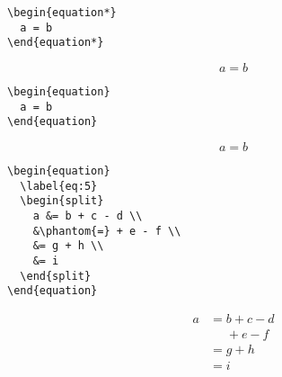\begin{table}[p]
  \caption[Comparaison des environnements pour les équations hors
  paragraphe de ]{%
    Comparaison des environnements pour les équations hors
    paragraphe de  (les lignes verticales indiquent les
    marges logiques).}
  \label{tab:math:displays}
  \renewcommand{\theequation}{\arabic{equation}}
  \begin{eqxample}
\begin{lstlisting}
\begin{equation*}
  a = b
\end{equation*}
\end{lstlisting}
    \producing
    \begin{equation*}
      a = b
    \end{equation*}
  \end{eqxample}

  \begin{eqxample}
\begin{lstlisting}
\begin{equation}
  a = b
\end{equation}
\end{lstlisting}
    \producing
    \begin{equation}
      a = b
    \end{equation}
  \end{eqxample}

  \begin{eqxample}
\begin{lstlisting}
\begin{equation}
  \label{eq:5}
  \begin{split}
    a &= b + c - d \\
    &\phantom{=} + e - f \\
    &= g + h \\
    &= i
  \end{split}
\end{equation}
\end{lstlisting}
    \producing
    \begin{equation}\label{eq:math:5}
      \begin{split}
        a& =b+c-d\\
        &\phantom{=} +e-f\\
        & =g+h\\
        & =i
      \end{split}
    \end{equation}
  \end{eqxample}


\end{table}
